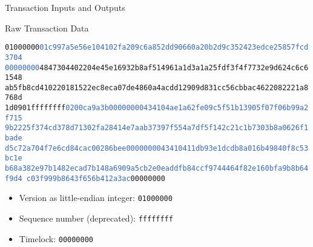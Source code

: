 \documentclass[]{beamer}
\begin{document}
\begin{frame}{Transaction Inputs and Outputs}
	\begin{figure}
			
	\end{figure}

\end{frame}




\begin{frame}{Raw Transaction Data}
\begin{scriptsize}
\texttt{01000000\textcolor{highlight}{01c997a5e56e104102fa209c6a852dd90660a20b2d9c352423edce25857fcd3704
00000000}\textcolor{focus}{4847304402204e45e16932b8af514961a1d3a1a25fdf3f4f7732e9d624c6c61548
ab5fb8cd410220181522ec8eca07de4860a4acdd12909d831cc56cbbac4622082221a8768d
1d0901}ffffffff\textcolor{highlight}{0200ca9a3b00000000434104ae1a62fe09c5f51b13905f07f06b99a2f715
9b2225f374cd378d71302fa28414e7aab37397f554a7df5f142c21c1b7303b8a0626f1bade
d5c72a704f7e6cd84cac00286bee0000000043410411db93e1dcdb8a016b49840f8c53bc1e
b68a382e97b1482ecad7b148a6909a5cb2e0eaddfb84ccf9744464f82e160bfa9b8b64f9d4
c03f999b8643f656b412a3ac}00000000}
\vspace{1em}
\end{scriptsize}
\scriptsize
\begin{itemize}
	\item<2-> Version as little-endian integer: \texttt{01000000}
	\item<2-> Sequence number (deprecated): \texttt{ffffffff}
	\item<2-> Timelock: \texttt{00000000}
\end{itemize}
\end{frame}
\end{document}
